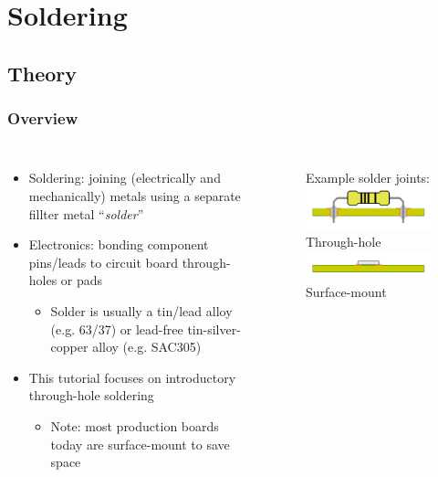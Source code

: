 \documentclass{beamer}
\begin{document}
\section{Soldering} %
\subsection{Theory}
\begin{frame}
\frametitle{Overview}
\begin{columns}[t]
\begin{itemize}
  \item Soldering: joining (electrically and mechanically) metals using a separate fillter metal ``\textit{solder}''
  \item Electronics: bonding component pins/leads to circuit board through-holes or pads
  \begin{itemize}
    \item Solder is usually a tin/lead alloy (e.g. 63/37) or lead-free tin-silver-copper alloy (e.g. SAC305)
  \end{itemize}
  \item This tutorial focuses on introductory through-hole soldering
  \begin{itemize}
    \item Note: most production boards today are surface-mount to save space
  \end{itemize}
\end{itemize}

\begin{figure}
\centering
Example solder joints: \\
\vspace{20px}
\includegraphics[width=1.0\columnwidth]{images-dis1/pcb-pth} \\
Through-hole \\
\vspace{20px}
\includegraphics[width=1.0\columnwidth]{images-dis1/pcb-smt} \\
Surface-mount
\end{figure}
\end{columns}
\end{frame}
\end{document}
